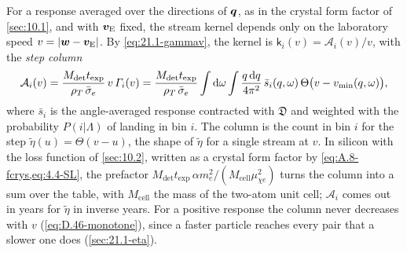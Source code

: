 For a response averaged over the directions of $\bm{q}$, as in the crystal form factor of \cref{sec:10.1}, and with $\bm{v}_{\mathrm{E}}$ fixed, the stream kernel depends only on the laboratory speed $v = |\bm{w} - \bm{v}_{\mathrm{E}}|$. By \cref{eq:21.1-gammav}, the kernel is $\mathsf{k}_i(v) = \mathcal{A}_i(v)/v$, with the \emph{step column}
\begin{equation}
  \mathcal{A}_i(v) = \frac{M_{\mathrm{det}}t_{\mathrm{exp}}}{\rho_T\,\bar{\sigma}_{e}}\,v\,\varGamma_i(v) = \frac{M_{\mathrm{det}}t_{\mathrm{exp}}}{\rho_T\,\bar{\sigma}_{e}}\int\mathrm{d}\omega\int\frac{q\,\mathrm{d} q}{4\pi^2}\,\bar s_i(q,\omega)\,\Theta\bigl(v - v_{\mathrm{min}}(q,\omega)\bigr) ,
  \label{eq:21.2-column}
\end{equation}
where $\bar s_i$ is the angle-averaged response contracted with $\mathfrak{D}$ and weighted with the probability $P(i|\Lambda)$ of landing in bin $i$. The column is the count in bin $i$ for the step $\tilde\eta(u) = \Theta(v - u)$, the shape of $\tilde\eta$ for a single stream at $v$. In silicon with the loss function of \cref{sec:10.2}, written as a crystal form factor by \cref{eq:A.8-fcrys,eq:4.4-SL}, the prefactor $M_{\mathrm{det}}t_{\mathrm{exp}}\,\alpha m_e^2/(M_{\mathrm{cell}}\mu_{\chi e}^2)$ turns the column into a sum over the table, with $M_{\mathrm{cell}}$ the mass of the two-atom unit cell; $\mathcal{A}_i$ comes out in years for $\tilde\eta$ in inverse years. For a positive response the column never decreases with $v$ (\cref{eq:D.46-monotone}), since a faster particle reaches every pair that a slower one does (\cref{sec:21.1-eta}).

